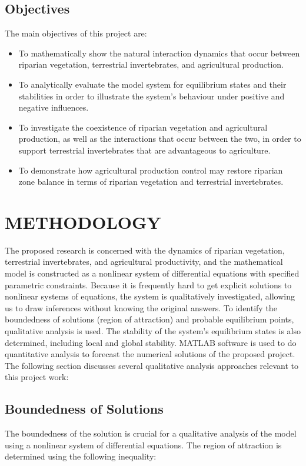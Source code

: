 \documentclass[12pt,a4wide]{report}
\numberwithin{equation}{chapter}
\numberwithin{theorem}{chapter}
\begin{document}
\section{Objectives}
The main objectives of this project are:
\begin{itemize}
\item To mathematically show the natural interaction dynamics that occur between riparian vegetation, terrestrial invertebrates, and agricultural production.
\item To analytically evaluate the model system for equilibrium states and their stabilities in order to illustrate the system's behaviour under positive and negative influences.
\item To investigate the coexistence of riparian vegetation and agricultural production, as well as the interactions that occur between the two, in order to support terrestrial invertebrates that are advantageous to agriculture.
\item To demonstrate how agricultural production control may restore riparian zone balance in terms of riparian vegetation and terrestrial invertebrates.
\end{itemize}

\chapter{METHODOLOGY}
\label{Chapter2}
\vspace{-1cm}
The proposed research is concerned with the dynamics of riparian vegetation, terrestrial invertebrates, and agricultural productivity, and the mathematical model is constructed as a nonlinear system of differential equations with specified parametric constraints. Because it is frequently hard to get explicit solutions to nonlinear systems of equations, the system is qualitatively investigated, allowing us to draw inferences without knowing the original answers. To identify the boundedness of solutions (region of attraction) and probable equilibrium points, qualitative analysis is used. The stability of the system’s equilibrium states is also determined, including local and global stability. MATLAB software is used to do quantitative analysis to forecast the numerical solutions of the proposed project. \\

The following section discusses several qualitative analysis approaches relevant to this project work:

\section{Boundedness of Solutions}
The boundedness of the solution is crucial for a qualitative analysis of the model using a nonlinear system of differential equations. The region of attraction is determined using the following inequality:
\end{document}
